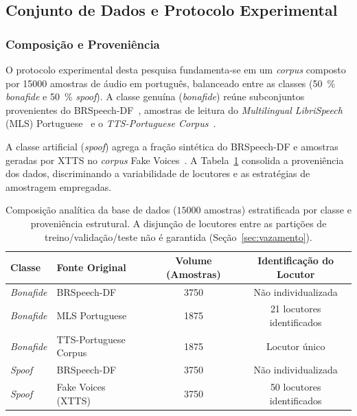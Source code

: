 \documentclass[12pt,a4paper]{article}
\begin{document}
\subsection{Conjunto de Dados e Protocolo Experimental}
\label{sec:dataset_protocolo}

\subsubsection{Composição e Proveniência}

O protocolo experimental desta pesquisa fundamenta-se em um \textit{corpus}
composto por \num{15000} amostras de áudio em português, balanceado entre as
classes (\SI{50}{\percent} \textit{bonafide} e \SI{50}{\percent}
\textit{spoof}). A classe genuína (\textit{bonafide}) reúne subconjuntos
provenientes do BRSpeech-DF~\cite{brspeechdf_card}, amostras de leitura do
\textit{Multilingual LibriSpeech} (MLS) Portuguese~\cite{pratap2020mls} e o
\textit{TTS-Portuguese Corpus}~\cite{ttspt_card}.

A classe artificial (\textit{spoof}) agrega a fração sintética do BRSpeech-DF e
amostras geradas por XTTS no \textit{corpus} Fake
Voices~\cite{fakevoices_card}. A Tabela~\ref{tab:dataset_fontes} consolida a
proveniência dos dados, discriminando a variabilidade de locutores e as
estratégias de amostragem empregadas.

\begin{table}[tbp]
\centering
\caption{Composição analítica da base de dados ($\num{15000}$ amostras)
estratificada por classe e proveniência estrutural. A disjunção de locutores
entre as partições de treino/validação/teste não é garantida
(Seção~\ref{sec:vazamento}).}
\label{tab:dataset_fontes}
\small
\begin{tabular}{llcc}
\toprule
\textbf{Classe} & \textbf{Fonte Original} & \textbf{Volume (Amostras)} & \textbf{Identificação do Locutor} \\
\midrule
\textit{Bonafide} & BRSpeech-DF & \num[group-minimum-digits=4]{3750} & Não individualizada \\
\textit{Bonafide} & MLS Portuguese & \num[group-minimum-digits=4]{1875} & \num{21} locutores identificados \\
\textit{Bonafide} & TTS-Portuguese Corpus & \num[group-minimum-digits=4]{1875} & Locutor único \\
\addlinespace
\textit{Spoof} & BRSpeech-DF & \num[group-minimum-digits=4]{3750} & Não individualizada \\
\textit{Spoof} & Fake Voices (XTTS) & \num[group-minimum-digits=4]{3750} & \num{50} locutores identificados \\
\bottomrule
\end{tabular}
\end{table}
\end{document}

